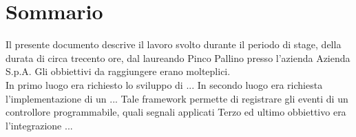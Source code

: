 
\cleardoublepage
{}
{}
\begingroup
\let\clearpage\relax
\let\cleardoublepage\relax
\let\cleardoublepage\relax

\chapter*{Sommario}

Il presente documento descrive il lavoro svolto durante il periodo di stage, della durata di circa trecento ore, dal laureando Pinco Pallino presso l'azienda Azienda S.p.A.
Gli obbiettivi da raggiungere erano molteplici.\\
In primo luogo era richiesto lo sviluppo di ...
In secondo luogo era richiesta l'implementazione di un ... 
Tale framework permette di registrare gli eventi di un controllore programmabile, quali segnali applicati 
Terzo ed ultimo obbiettivo era l'integrazione ...

%
%

\endgroup			

\vfill


